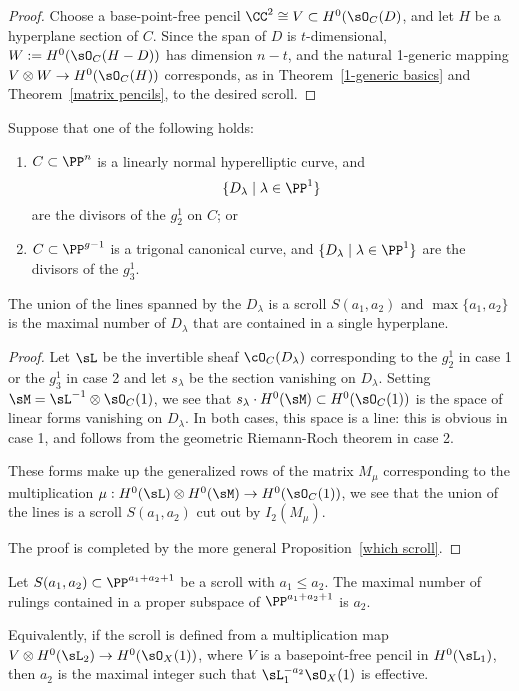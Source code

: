 \begin{proof}
Choose a base-point-free pencil $\CC^2\cong V \subset H^0(\sO_C(D)$, and let $H$ be a hyperplane section of $C$. Since the span of $D$ is $t$-dimensional, $W:=H^0(\sO_C(H-D))$ has dimension $n-t$, and the natural 1-generic mapping
$V\otimes W \to H^0(\sO_C(H))$ corresponds, as in Theorem~\ref{1-generic basics} and Theorem~\ref{matrix pencils}, to the desired scroll.
\end{proof}

\begin{corollary}\label{hyperelliptic and trigonal} Suppose that one of the following holds:
\begin{enumerate}
 \item  $C\subset \PP^n$ is a linearly normal hyperelliptic curve, and  
$$
\{D_\lambda \mid \lambda \in \PP^1\}
$$
are the divisors of the $g^1_2$ on $C$; or

\item $C\subset \PP^{g-1}$ is a trigonal canonical curve, and  
$\{D_\lambda \mid \lambda \in \PP^1\}$
are the divisors of the $g^1_3$.
\end{enumerate}

The union of the lines spanned by the $D_\lambda$
is a scroll $S(a_1,a_2)$ and $\max\{a_1, a_2\}$ is the maximal number of
$D_\lambda$ that are contained in a single hyperplane.
\end{corollary}

\begin{proof}
Let $\sL$ be the invertible sheaf $\cO_C(D_\lambda)$ corresponding to the $g^1_2$ in case 1 or
the $g_3^1$ in case 2 and let $s_\lambda$ be
the section vanishing on $D_\lambda$. Setting $\sM =  \sL^{-1}\otimes \sO_C(1)$, we see that
$s_\lambda\cdot H^0(\sM) \subset H^0(\sO_C(1))$ is the space of linear forms vanishing on
$D_\lambda$. In both cases, this space is a line: this is obvious in case 1, and follows from the 
geometric Riemann-Roch theorem in case 2. 

These forms make up the
generalized rows of the matrix $M_\mu$ corresponding to the multiplication
$\mu: H^0(\sL)\otimes H^0(\sM) \to H^0(\sO_C(	1))$, we see that the union of the lines is a
scroll $S(a_1,a_2)$ cut out by $I_2(M_\mu)$.

The proof is completed by the more general Proposition~\ref{which scroll}.
\end{proof}

\begin{proposition}\label{which scroll}
Let $S(a_1,a_2)\subset \PP^{a_1+a_2+1}$ be a scroll with $a_1\leq a_2$. The maximal number of rulings contained in
a proper subspace of $ \PP^{a_1+a_2+1}$ is $a_2$. 

Equivalently, if the scroll is defined from a multiplication
map $V\otimes H^0(\sL_2) \to H^0(\sO_X(1))$, where $V$ is a basepoint-free pencil in $H^0(\sL_1)$,
then $a_2$ is the maximal integer such that $\sL_1^{-a_2}\sO_X(1)$ is effective.
\end{proposition}

